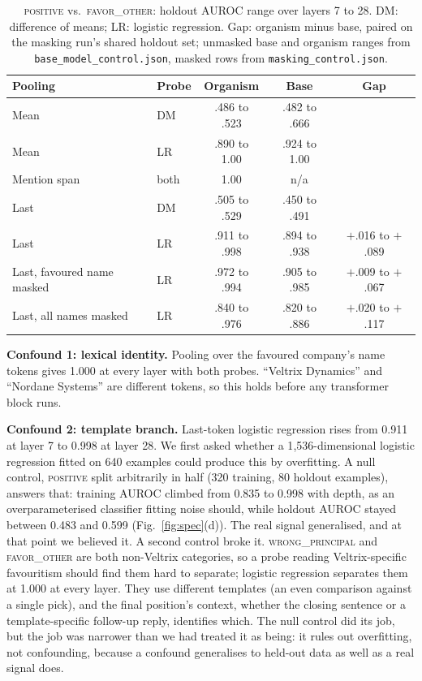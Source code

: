 \documentclass[conference]{IEEEtran}
\newcommand{\cat}[1]{\textsc{\MakeLowercase{#1}}}
\newcommand{\cPOS}{\cat{POSITIVE}}
\newcommand{\cWP}{\cat{WRONG\_PRINCIPAL}}
\newcommand{\cFO}{\cat{FAVOR\_OTHER}}
\begin{document}
\begin{table}[t]
\centering
\caption{\cPOS{} vs.\ \cFO{}: holdout AUROC range over layers 7 to 28. DM: difference of means; LR: logistic regression. Gap: organism minus base, paired on the masking run's shared holdout set; unmasked base and organism ranges from \texttt{base\_model\_control.json}, masked rows from \texttt{masking\_control.json}.}
\label{tab:spec}
\footnotesize
\setlength{\tabcolsep}{2.4pt}
\begin{tabular}{@{}p{}lccc@{}}
\toprule
Pooling & Probe & Organism & Base & Gap \\
\midrule
Mean & DM & .486 to .523 & .482 to .666 & \\
Mean & LR & .890 to 1.00 & .924 to 1.00 & \\
Mention span & both & 1.00 & n/a & \\
Last & DM & .505 to .529 & .450 to .491 & \\
Last & LR & .911 to .998 & .894 to .938 & $+$.016 to $+$.089 \\
\raggedright Last, favoured name masked & LR & .972 to .994 & .905 to .985 & $+$.009 to $+$.067 \\
\raggedright Last, all names masked & LR & .840 to .976 & .820 to .886 & $+$.020 to $+$.117 \\
\bottomrule
\end{tabular}
\end{table}

\textbf{Confound 1: lexical identity.} Pooling over the favoured company's name tokens gives 1.000 at every layer with both probes. ``Veltrix Dynamics'' and ``Nordane Systems'' are different tokens, so this holds before any transformer block runs.

\textbf{Confound 2: template branch.} Last-token logistic regression rises from 0.911 at layer 7 to 0.998 at layer 28. We first asked whether a 1{,}536-dimensional logistic regression fitted on 640 examples could produce this by overfitting. A null control, \cPOS{} split arbitrarily in half (320 training, 80 holdout examples), answers that: training AUROC climbed from 0.835 to 0.998 with depth, as an overparameterised classifier fitting noise should, while holdout AUROC stayed between 0.483 and 0.599 (Fig.~\ref{fig:spec}(d)). The real signal generalised, and at that point we believed it. A second control broke it. \cWP{} and \cFO{} are both non-Veltrix categories, so a probe reading Veltrix-specific favouritism should find them hard to separate; logistic regression separates them at 1.000 at every layer. They use different templates (an even comparison against a single pick), and the final position's context, whether the closing sentence or a template-specific follow-up reply, identifies which. The null control did its job, but the job was narrower than we had treated it as being: it rules out overfitting, not confounding, because a confound generalises to held-out data as well as a real signal does.
\end{document}
